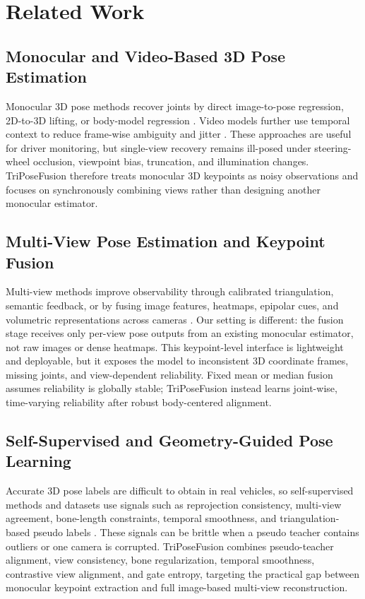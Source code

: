 \documentclass[runningheads]{llncs}
\begin{document}
\section{Related Work}
\label{sec:related}

\subsection{Monocular and Video-Based 3D Pose Estimation}
Monocular 3D pose methods recover joints by direct image-to-pose regression, 2D-to-3D lifting, or body-model regression \cite{toshev2014deeppose,martinez2017simple,zhou2017towards,mehta2017vnect,kanazawa2018end}. Video models further use temporal context to reduce frame-wise ambiguity and jitter \cite{pavllo20193d,kocabas2020vibe}. These approaches are useful for driver monitoring, but single-view recovery remains ill-posed under steering-wheel occlusion, viewpoint bias, truncation, and illumination changes. TriPoseFusion therefore treats monocular 3D keypoints as noisy observations and focuses on synchronously combining views rather than designing another monocular estimator.

\subsection{Multi-View Pose Estimation and Keypoint Fusion}
Multi-view methods improve observability through calibrated triangulation, semantic feedback, or by fusing image features, heatmaps, epipolar cues, and volumetric representations across cameras \cite{iskakov2019learnable,qiu2019cross,he2020epipolar,tu2020voxelpose,bultmann2021real,nogueira2024markerless}. Our setting is different: the fusion stage receives only per-view pose outputs from an existing monocular estimator, not raw images or dense heatmaps. This keypoint-level interface is lightweight and deployable, but it exposes the model to inconsistent 3D coordinate frames, missing joints, and view-dependent reliability. Fixed mean or median fusion assumes reliability is globally stable; TriPoseFusion instead learns joint-wise, time-varying reliability after robust body-centered alignment.

\subsection{Self-Supervised and Geometry-Guided Pose Learning}
Accurate 3D pose labels are difficult to obtain in real vehicles, so self-supervised methods and datasets use signals such as reprojection consistency, multi-view agreement, bone-length constraints, temporal smoothness, and triangulation-based pseudo labels \cite{rhodin2018learning,kocabas2019self,iskakov2019learnable,wandt2021canonpose,fan2023humanm3}. These signals can be brittle when a pseudo teacher contains outliers or one camera is corrupted. TriPoseFusion combines pseudo-teacher alignment, view consistency, bone regularization, temporal smoothness, contrastive view alignment, and gate entropy, targeting the practical gap between monocular keypoint extraction and full image-based multi-view reconstruction.
\end{document}
